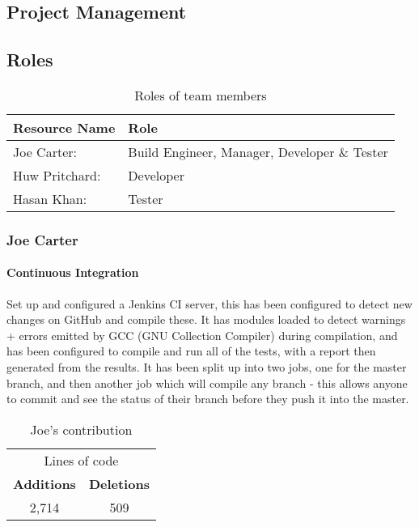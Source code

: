 \documentclass{unitemplate}
\begin{document}
\subsection{Project Management}

\subsection{Roles}
\begin{table}[h]
\centering
\begin{tabularx}{\textwidth}{|l|X|} \hline
    \textbf{Resource Name} & \textbf{Role} \\\hline
    Joe Carter: &  Build Engineer, Manager, Developer \& Tester\\\hline
    Huw Pritchard: & Developer\\\hline
    Hasan Khan: & Tester\\\hline
\end{tabularx}
    \caption{Roles of team members}
    \label{tab:roles}
\end{table}

\subsubsection{Joe Carter}
\paragraph{Continuous Integration} Set up and configured a Jenkins CI server, this has been configured to detect new changes on GitHub and compile these. It has modules loaded to detect warnings + errors emitted by GCC (GNU Collection Compiler) during compilation, and has been configured to compile and run all of the tests, with a report then generated from the results. It has been split up into two jobs, one for the master branch, and then another job which will compile any branch - this allows anyone to commit and see the status of their branch before they push it into the master.

\begin{table}[h]
\centering
\begin{tabular}{c|c}
\multicolumn{2}{c}{Lines of code}\\
\textbf{Additions} & \textbf{Deletions} \\
2,714 & 509
\end{tabular}
\caption{Joe's contribution}
\label{tab:joecon}
\end{table}
\end{document}
